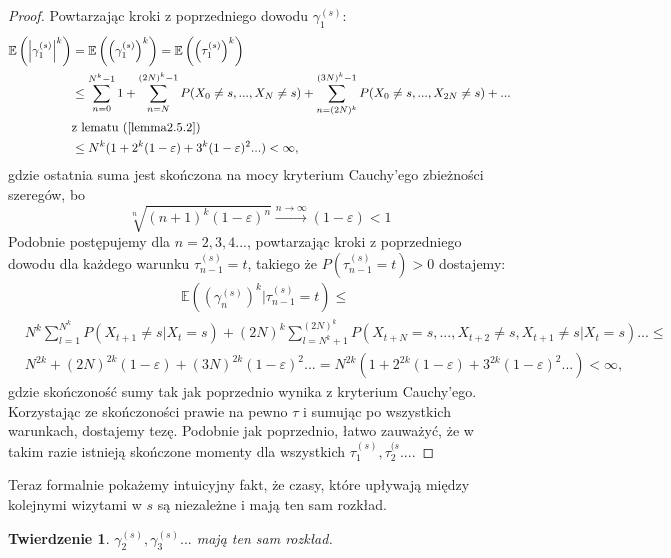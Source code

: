 \documentclass[a4paper]{article}
\theoremstyle{defn}
\theoremstyle{theorem}
\newtheorem{theorem}[defn]{Twierdzenie}
\theoremstyle{lemma}
\theoremstyle{cor}
\theoremstyle{fact}
\begin{document}
\begin{proof}Powtarzając kroki z poprzedniego dowodu $\gamma_1^{(s)}$:
\begin{align*}
    \mathbb{E}\left(\left|\gamma_1^{(s)}\right|^k\right) &= \mathbb{E}\left(\left(\gamma_1^{(s)}\right)^k\right) = \mathbb{E}\left(\left(\tau_1^{(s)}\right)^k\right)\\
    &\leq \sum\limits_{n = 0}^{N^k-1} 1 + \sum\limits_{n = N}^{(2N)^k - 1} P(X_0 \neq s,..., X_N \neq s) + \sum\limits_{n = (2N)^k}^{(3N)^k - 1} P(X_0 \neq s,..., X_{2N} \neq s)+...\\
    &\text{z lematu (\ref{lemma2.5.2})}\\
    &\leq N^k(1 + 2^k(1-\varepsilon) + 3^k(1 - \varepsilon)^2 ...) < \infty,
\end{align*}
gdzie ostatnia suma jest skończona na mocy kryterium Cauchy'ego zbieżności szeregów, bo
$$\sqrt[n]{(n+1)^k(1-\varepsilon)^n} \xrightarrow{n \to \infty} (1-\varepsilon) < 1$$
Podobnie postępujemy dla $n=2,3,4...$, powtarzając kroki z poprzedniego dowodu dla każdego warunku $\tau^{(s)}_{n-1} = t$, takiego że $P(\tau^{(s)}_{n-1} = t) > 0$ dostajemy:
\begin{align*}
    &\mathbb{E}\left(\left(\gamma^{(s)}_n\right)^k|\tau^{(s)}_{n-1} = t\right) \leq
\end{align*}
\begin{align*}
    &N^k \sum\limits_{l = 1}^{N^k} P(X_{t+1} \neq s| X_t = s) + (2N)^k\sum\limits_{l = N^k+1}^{(2N)^k} P(X_{t+N} = s, ..., X_{t+2} \neq s, X_{t+1} \neq s| X_t = s)...\leq\\
    &N^{2k} + (2N)^{2k}(1-\varepsilon) + (3N)^{2k}(1-\varepsilon)^2 ... = N^{2k}(1 + 2^{2k}(1-\varepsilon) + 3^{2k}(1 - \varepsilon)^2 ...) < \infty,
\end{align*}
gdzie skończoność sumy tak jak poprzednio wynika z kryterium Cauchy'ego. Korzystając ze skończoności prawie na pewno $\tau$ i sumując po wszystkich warunkach, dostajemy tezę. Podobnie jak poprzednio, łatwo zauważyć, że w takim razie istnieją skończone momenty dla wszystkich $\tau_1^{(s)}, \tau_2^{(s}...$.
\end{proof}
Teraz formalnie pokażemy intuicyjny fakt, że czasy, które upływają między kolejnymi wizytami w $s$ są niezależne i mają ten sam rozkład.
\begin{theorem}\label{theorem2.5.8}
$\gamma_2^{(s)}, \gamma_3^{(s)}...$ mają ten sam rozkład.
\end{theorem}
\end{document}
